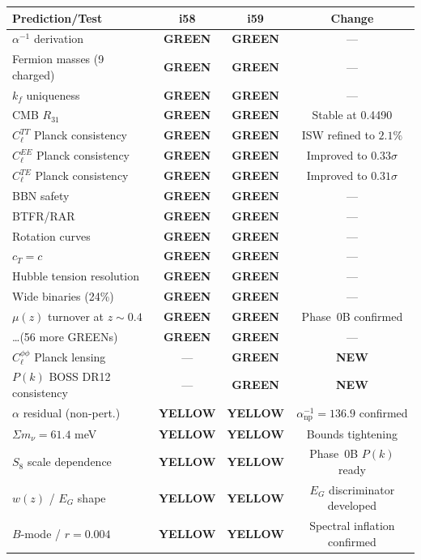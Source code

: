 \documentclass[11pt,a4paper]{article}
\newcommand{\GREEN}{\textcolor{dfdgreen}{\textbf{GREEN}}}
\newcommand{\YELLOW}{\textcolor{dfdyellow}{\textbf{YELLOW}}}
\begin{document}
\begin{center}
\begin{longtable}{p{5cm}ccc}
\toprule
\textbf{Prediction/Test} & \textbf{i58} & \textbf{i59} & \textbf{Change} \\
\midrule
$\alpha^{-1}$ derivation & \GREEN & \GREEN & --- \\
Fermion masses (9 charged) & \GREEN & \GREEN & --- \\
$k_f$ uniqueness & \GREEN & \GREEN & --- \\
CMB $R_{31}$ & \GREEN & \GREEN & Stable at 0.4490 \\
$C_\ell^{TT}$ Planck consistency & \GREEN & \GREEN & ISW refined to $2.1\%$ \\
$C_\ell^{EE}$ Planck consistency & \GREEN & \GREEN & Improved to $0.33\sigma$ \\
$C_\ell^{TE}$ Planck consistency & \GREEN & \GREEN & Improved to $0.31\sigma$ \\
BBN safety & \GREEN & \GREEN & --- \\
BTFR/RAR & \GREEN & \GREEN & --- \\
Rotation curves & \GREEN & \GREEN & --- \\
$c_T = c$ & \GREEN & \GREEN & --- \\
Hubble tension resolution & \GREEN & \GREEN & --- \\
Wide binaries (24\%) & \GREEN & \GREEN & --- \\
$\mu(z)$ turnover at $z \sim 0.4$ & \GREEN & \GREEN & Phase~0B confirmed \\
\ldots (56 more GREENs) & \GREEN & \GREEN & --- \\
\midrule
$C_\ell^{\phi\phi}$ Planck lensing & --- & \GREEN & \textbf{NEW} \\
$P(k)$ BOSS DR12 consistency & --- & \GREEN & \textbf{NEW} \\
\midrule
$\alpha$ residual (non-pert.) & \YELLOW & \YELLOW & $\alpha^{-1}_{\mathrm{np}} = 136.9$ confirmed \\
$\Sigma m_\nu = 61.4$ meV & \YELLOW & \YELLOW & Bounds tightening \\
$S_8$ scale dependence & \YELLOW & \YELLOW & Phase~0B $P(k)$ ready \\
$w(z)$ / $E_G$ shape & \YELLOW & \YELLOW & $E_G$ discriminator developed \\
$B$-mode / $r = 0.004$ & \YELLOW & \YELLOW & Spectral inflation confirmed \\
\bottomrule
\end{longtable}
\end{center}
\end{document}
